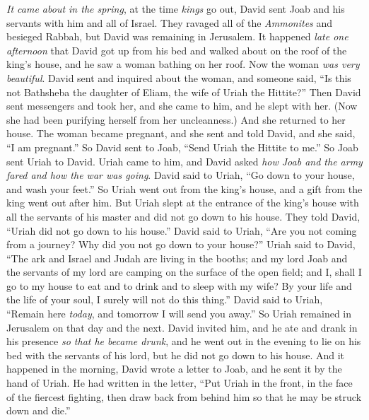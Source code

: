 \begin{biblechapter} %
 \textit{It came about in the spring}, at the time \textit{kings} go out, David sent Joab and his servants with him and all of Israel. They ravaged all of the \textit{Ammonites} and besieged Rabbah, but David was remaining in Jerusalem.
\verse It happened \textit{late one afternoon} that David got up from his bed and walked about on the roof of the king’s house, and he saw a woman bathing on her roof. Now the woman \textit{was very beautiful}.
\verse David sent and inquired about the woman, and someone said, “Is this not Bathsheba the daughter of Eliam, the wife of Uriah the Hittite?”
\verse Then David sent messengers and took her, and she came to him, and he slept with her. (Now she had been purifying herself from her uncleanness.) And she returned to her house.
\verse The woman became pregnant, and she sent and told David, and she said, “I am pregnant.”
\verse So David sent to Joab, “Send Uriah the Hittite to me.” So Joab sent Uriah to David.
\verse Uriah came to him, and David asked \textit{how Joab and the army fared and how the war was going}.
\verse David said to Uriah, “Go down to your house, and wash your feet.” So Uriah went out from the king’s house, and a gift from the king went out after him.
\verse But Uriah slept at the entrance of the king’s house with all the servants of his master and did not go down to his house.
\verse They told David, “Uriah did not go down to his house.” David said to Uriah, “Are you not coming from a journey? Why did you not go down to your house?”
\verse Uriah said to David, “The ark and Israel and Judah are living in the booths; and my lord Joab and the servants of my lord are camping on the surface of the open field; and I, shall I go to my house to eat and to drink and to sleep with my wife? By your life and the life of your soul, I surely will not do this thing.”
\verse David said to Uriah, “Remain here \textit{today}, and tomorrow I will send you away.” So Uriah remained in Jerusalem on that day and the next.
\verse David invited him, and he ate and drank in his presence \textit{so that he became drunk}, and he went out in the evening to lie on his bed with the servants of his lord, but he did not go down to his house.
\verse And it happened in the morning, David wrote a letter to Joab, and he sent it by the hand of Uriah.
\verse He had written in the letter, “Put Uriah in the front, in the face of the fiercest fighting, then draw back from behind him so that he may be struck down and die.”

\end{biblechapter}
